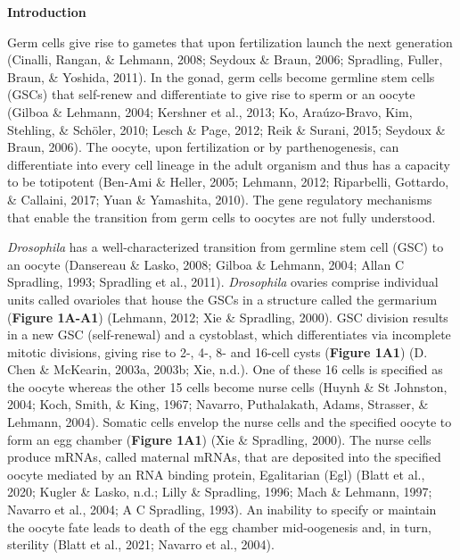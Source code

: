 \documentclass[12pt,oneside]{reedthesis}
\begin{document}
\textbf{Introduction}

Germ cells give rise to gametes that upon fertilization launch the next
generation (Cinalli, Rangan, \& Lehmann, 2008; Seydoux \& Braun, 2006; Spradling, Fuller, Braun, \& Yoshida, 2011). In the gonad, germ cells become
germline stem cells (GSCs) that self-renew and differentiate to give
rise to sperm or an oocyte (Gilboa \& Lehmann, 2004; Kershner et al., 2013; Ko, Araúzo-Bravo, Kim, Stehling, \& Schöler, 2010; Lesch \& Page, 2012; Reik \& Surani, 2015; Seydoux \& Braun, 2006). The oocyte, upon fertilization
or by parthenogenesis, can differentiate into every cell lineage in the
adult organism and thus has a capacity to be totipotent
(Ben-Ami \& Heller, 2005; Lehmann, 2012; Riparbelli, Gottardo, \& Callaini, 2017; Yuan \& Yamashita, 2010). The gene regulatory mechanisms that
enable the transition from germ cells to oocytes are not fully
understood.

\emph{Drosophila} has a well-characterized transition from germline stem cell
(GSC) to an oocyte (Dansereau \& Lasko, 2008; Gilboa \& Lehmann, 2004; Allan C Spradling, 1993; Spradling et al., 2011). \emph{Drosophila} ovaries comprise
individual units called ovarioles that house the GSCs in a structure
called the germarium (\textbf{Figure 1A-A1})
(Lehmann, 2012; Xie \& Spradling, 2000). GSC
division results in a new GSC (self-renewal) and a cystoblast, which
differentiates via incomplete mitotic divisions, giving rise to 2-, 4-,
8- and 16-cell cysts (\textbf{Figure 1A1})
(D. Chen \& McKearin, 2003a, 2003b; Xie, n.d.). One of
these 16 cells is specified as the oocyte whereas the other 15 cells
become nurse cells (Huynh \& St Johnston, 2004; Koch, Smith, \& King, 1967; Navarro, Puthalakath, Adams, Strasser, \& Lehmann, 2004). Somatic cells envelop the nurse
cells and the specified oocyte to form an egg chamber (\textbf{Figure 1A1})
(Xie \& Spradling, 2000). The nurse cells produce mRNAs, called
maternal mRNAs, that are deposited into the specified oocyte mediated by
an RNA binding protein, Egalitarian (Egl)
(Blatt et al., 2020; Kugler \& Lasko, n.d.; Lilly \& Spradling, 1996; Mach \& Lehmann, 1997; Navarro et al., 2004; A C Spradling, 1993). An inability to specify or
maintain the oocyte fate leads to death of the egg chamber mid-oogenesis
and, in turn, sterility (Blatt et al., 2021; Navarro et al., 2004).
\end{document}
